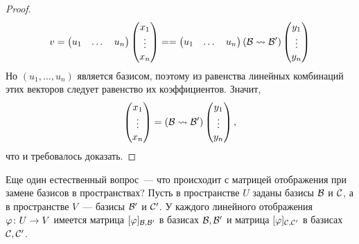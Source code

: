 \begin{proof}
$$
v=\begin{pmatrix}u_1 & \dots & u_n\end{pmatrix}
\begin{pmatrix}x_1 \\ \vdots \\ x_n\end{pmatrix} = 
=\begin{pmatrix}u_1 & \dots & u_n\end{pmatrix}
(\mathcal B\rightsquigarrow\mathcal B')
\begin{pmatrix}y_1 \\ \vdots \\ y_n\end{pmatrix}
$$
Но $(u_1,\dots,u_n)$ является базисом, поэтому из равенства линейных
комбинаций этих векторов следует равенство их коэффициентов.
Значит,
$$
\begin{pmatrix}x_1 \\ \vdots \\ x_n\end{pmatrix} = 
(\mathcal B\rightsquigarrow\mathcal B')
\begin{pmatrix}y_1 \\ \vdots \\ y_n\end{pmatrix},
$$
что и требовалось доказать.
\end{proof}




Еще один естественный вопрос~--- что происходит с матрицей отображения
при замене базисов в пространствах?
Пусть в пространстве $U$ заданы базисы $\mathcal B$ и $\mathcal C$, а в
пространстве $V$~--- базисы $\mathcal B'$ и $\mathcal C'$. У каждого линейного
отображения $\varphi\colon U\to V$ имеется матрица $[\varphi]_{\mathcal B,\mathcal B'}$
в базисах $\mathcal B,\mathcal B'$ и матрица $[\varphi]_{\mathcal C,\mathcal C'}$ в базисах
$\mathcal C,\mathcal C'$.

